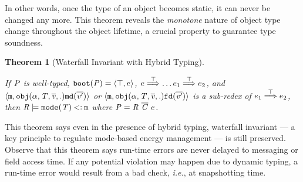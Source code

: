 \documentclass[onecolumn,nocopyrightspace]{sigplanconf}
\newtheorem{theorem}{Theorem} %
\theoremstyle{lessintrusive}
\theoremstyle{plain}
\theoremstyle{custom}
\theoremstyle{subcase-custom}
\begin{document}
In other words, once the type of an object becomes static, it can never be changed any more. This theorem reveals the \emph{monotone} nature of object type change throughout the object lifetime, a crucial property to guarantee type soundness. 

\begin{theorem}[Waterfall Invariant with Hybrid Typing]
\label{pf:waterfallinvariant}

If $ \mathit{P}$ is well-typed, $\mathtt{boot}(\mathit{P}) = \langle\top,e\rangle$, $e \stackrel{\top}{\Longrightarrow} \dots e_1 \stackrel{\top}{\Longrightarrow} e_2$, and $\langle\mathtt{m},\mathtt{obj}(\alpha, \mathit{T},\overline{\mathit{v}},.)\mathtt{md}(\overline{\mathit{v}'})\rangle$ or $\langle\mathtt{m},\mathtt{obj}(\alpha, \mathit{T},\overline{\mathit{v}},.)\mathtt{fd}(\overline{\mathit{v}'})\rangle$ is a sub-redex of $e_1 \stackrel{\top}{\Longrightarrow} e_2$, then $\mathit{R} \models \mathtt{mode}(\mathit{T}) \mathbin{<\vcentcolon} \mathtt{m}$ where $\programcode = \rodef \ \overline{\classes} \ e$.
\end{theorem} 

This theorem says even in the presence of hybrid typing, waterfall invariant --- a key principle to regulate mode-based energy management --- is still preserved. Observe that this theorem says run-time errors are never delayed to messaging or field access time. If any potential violation may happen due to dynamic typing, a run-time error would result from a bad check, \emph{i.e.}, at snapshotting time.
\end{document}
